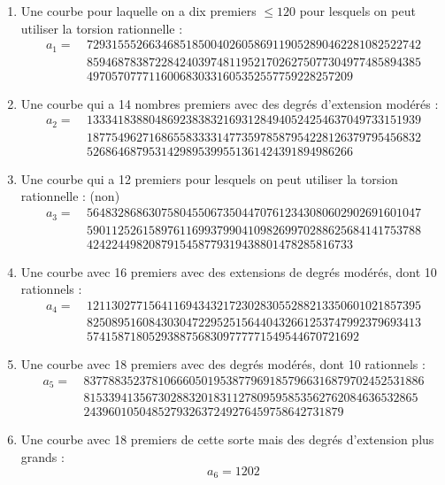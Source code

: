 \documentclass[11pt,a4paper]{article}
\theoremstyle{definition}
\begin{document}
\begin{enumerate}
\item Une courbe pour laquelle on a dix premiers $\leq 120$ pour lesquels on peut utiliser la torsion rationnelle :
$$\begin{aligned}
a_1 =\ & 729315552663468518500402605869119052890462281082522742 \\
& 859468783872284240397481195217026275077304977485894385 \\
& 4970570777116006830331605352557759228257209
\end{aligned}$$
\item Une courbe qui a 14 nombres premiers avec des degrés d'extension modérés :
$$\begin{aligned}
a_2 =\ & 133341838804869238383216931284940524254637049733151939 \\
& 187754962716865583333147735978587954228126379795456832 \\
& 5268646879531429895399551361424391894986266
\end{aligned}$$
\item Une courbe qui a 12 premiers pour lesquels on peut utiliser la torsion rationnelle : (non)
$$\begin{aligned}
a_3 =\ & 564832868630758045506735044707612343080602902691601047 \\
& 590112526158976116993799041098269970288625684141753788 \\
& 4242244982087915458779319438801478285816733
\end{aligned}$$
\item Une courbe avec 16 premiers avec des extensions de degrés modérés, dont 10 rationnels :
$$\begin{aligned}
a_4 =\ & 121130277156411694343217230283055288213350601021857395 \\
& 825089516084303047229525156440432661253747992379693413 \\
& 57415871805293887568309777771549544670721692
\end{aligned}$$
\item Une courbe avec 18 premiers avec des degrés modérés, dont 10 rationnels :
$$\begin{aligned}
a_5 =\ & 8377883523781066605019538779691857966316879702452531886 \\
& 815339413567302883201831127809595853562762084636532865 \\
& 243960105048527932637249276459758642731879
\end{aligned}$$
\item Une courbe avec 18 premiers de cette sorte mais des degrés d'extension plus grands :
$$a_6 = 1202$$

\end{enumerate}
\end{document}

